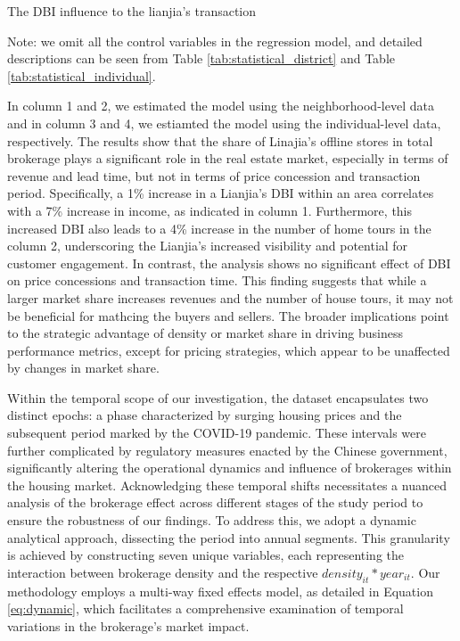 \documentclass[11pt]{article}
\begin{document}
\begin{table}[htb!]
    \centering
    \begin{scriptsize}
    
    \caption{The DBI influence to the lianjia's transaction}

    Note: we omit all the control variables in the regression model, and detailed descriptions can be seen from Table \ref{tab:statistical_district} and Table \ref{tab:statistical_individual}.
    \label{tab:stylized_fact}
    \end{scriptsize}
\end{table}

In column 1 and 2, we estimated the model using the neighborhood-level data and in column 3 and 4, we estiamted the model using the individual-level data, respectively. The results show that the share of Linajia's offline stores in total brokerage plays a significant role in the real estate market, especially in terms of revenue and lead time, but not in terms of price concession and transaction period. Specifically, a 1\% increase in a Lianjia's DBI within an area correlates with a 7\% increase in income, as indicated in column 1. Furthermore, this increased DBI also leads to a 4\% increase in the number of home tours in the column 2, underscoring the Lianjia's increased visibility and potential for customer engagement. In contrast, the analysis shows no significant effect of DBI on price concessions and transaction time. This finding suggests that while a larger market share increases revenues and the number of house tours, it may not be beneficial for mathcing the buyers and sellers. The broader implications point to the strategic advantage of density or market share in driving business performance metrics, except for pricing strategies, which appear to be unaffected by changes in market share.

Within the temporal scope of our investigation, the dataset encapsulates two distinct epochs: a phase characterized by surging housing prices and the subsequent period marked by the COVID-19 pandemic. These intervals were further complicated by regulatory measures enacted by the Chinese government, significantly altering the operational dynamics and influence of brokerages within the housing market. Acknowledging these temporal shifts necessitates a nuanced analysis of the brokerage effect across different stages of the study period to ensure the robustness of our findings. To address this, we adopt a dynamic analytical approach, dissecting the period into annual segments. This granularity is achieved by constructing seven unique variables, each representing the interaction between brokerage density and the respective $density_{it} * year_{it}$. Our methodology employs a multi-way fixed effects model, as detailed in Equation \eqref{eq:dynamic}, which facilitates a comprehensive examination of temporal variations in the brokerage's market impact.
\end{document}
